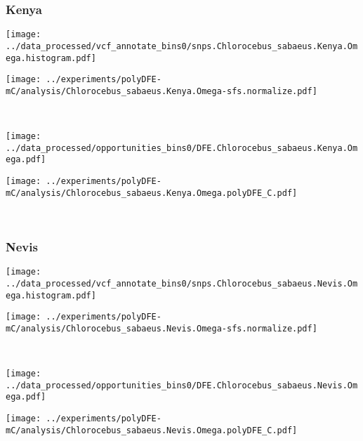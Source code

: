\subsubsection{Kenya}

\begin{minipage}{0.49\linewidth}
    \texttt{[image: ../data\_processed/vcf\_annotate\_bins0/snps.Chlorocebus\_sabaeus.Kenya.Omega.histogram.pdf]}
\end{minipage}
\begin{minipage}{0.49\linewidth}
    \texttt{[image: ../experiments/polyDFE-mC/analysis/Chlorocebus\_sabaeus.Kenya.Omega-sfs.normalize.pdf]}
\end{minipage}
\\
\begin{minipage}{0.49\linewidth}
    \texttt{[image: ../data\_processed/opportunities\_bins0/DFE.Chlorocebus\_sabaeus.Kenya.Omega.pdf]}
\end{minipage}
\begin{minipage}{0.49\linewidth}
    \texttt{[image: ../experiments/polyDFE-mC/analysis/Chlorocebus\_sabaeus.Kenya.Omega.polyDFE\_C.pdf]}
\end{minipage}
\\

\subsubsection{Nevis}

\begin{minipage}{0.49\linewidth}
    \texttt{[image: ../data\_processed/vcf\_annotate\_bins0/snps.Chlorocebus\_sabaeus.Nevis.Omega.histogram.pdf]}
\end{minipage}
\begin{minipage}{0.49\linewidth}
    \texttt{[image: ../experiments/polyDFE-mC/analysis/Chlorocebus\_sabaeus.Nevis.Omega-sfs.normalize.pdf]}
\end{minipage}
\\
\begin{minipage}{0.49\linewidth}
    \texttt{[image: ../data\_processed/opportunities\_bins0/DFE.Chlorocebus\_sabaeus.Nevis.Omega.pdf]}
\end{minipage}
\begin{minipage}{0.49\linewidth}
    \texttt{[image: ../experiments/polyDFE-mC/analysis/Chlorocebus\_sabaeus.Nevis.Omega.polyDFE\_C.pdf]}
\end{minipage}
\\

